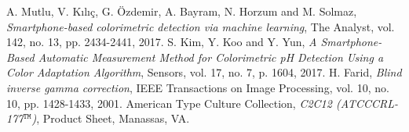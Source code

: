 \documentclass[journal]{IEEEtran}
\begin{document}

%
%
%
\begin{thebibliography}{1}
  
\bibitem{} A. Mutlu, V. Kılıç, G. Özdemir, A. Bayram, N. Horzum and M. Solmaz, \emph{Smartphone-based colorimetric detection via machine learning}, The Analyst, vol. 142, no. 13, pp. 2434-2441, 2017.
\bibitem{} S. Kim, Y. Koo and Y. Yun, \emph{A Smartphone-Based Automatic Measurement Method for Colorimetric pH Detection Using a Color Adaptation Algorithm}, Sensors, vol. 17, no. 7, p. 1604, 2017.
\bibitem{} H. Farid, \emph{Blind inverse gamma correction}, IEEE Transactions on Image Processing, vol. 10, no. 10, pp. 1428-1433, 2001.
\bibitem{} American Type Culture Collection, \emph{C2C12 (ATCC\textregistered CRL-177$^\texttt{TM}$)}, Product Sheet, Manassas, VA.

\end{thebibliography}
\end{document}
